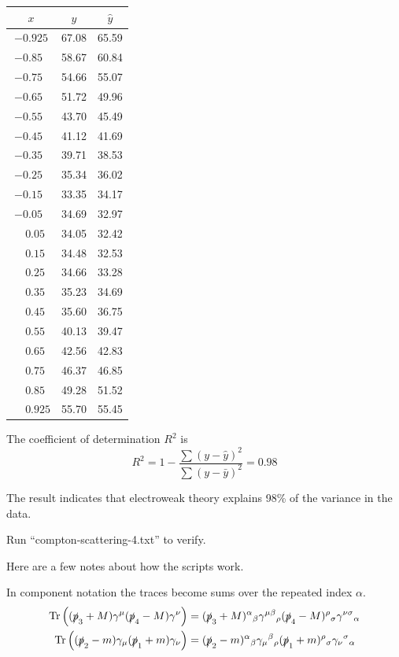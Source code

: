 \documentclass[12pt]{article}
\begin{document}
\begin{center}
\begin{tabular}{|c|c|c|}
\hline
$x$ & $y$ & $\hat{y}$ \\
\hline
$-0.925$ & 67.08 & 65.59\\
$-0.85\phantom{0}$ & 58.67 & 60.84\\
$-0.75\phantom{0}$ & 54.66 & 55.07\\
$-0.65\phantom{0}$ & 51.72 & 49.96\\
$-0.55\phantom{0}$ & 43.70 & 45.49\\
$-0.45\phantom{0}$ & 41.12 & 41.69\\
$-0.35\phantom{0}$ & 39.71 & 38.53\\
$-0.25\phantom{0}$ & 35.34 & 36.02\\
$-0.15\phantom{0}$ & 33.35 & 34.17\\
$-0.05\phantom{0}$ & 34.69 & 32.97\\
$\phantom{+}0.05\phantom{0}$ & 34.05 & 32.42\\
$\phantom{+}0.15\phantom{0}$ & 34.48 & 32.53\\
$\phantom{+}0.25\phantom{0}$ & 34.66 & 33.28\\
$\phantom{+}0.35\phantom{0}$ & 35.23 & 34.69\\
$\phantom{+}0.45\phantom{0}$ & 35.60 & 36.75\\
$\phantom{+}0.55\phantom{0}$ & 40.13 & 39.47\\
$\phantom{+}0.65\phantom{0}$ & 42.56 & 42.83\\
$\phantom{+}0.75\phantom{0}$ & 46.37 & 46.85\\
$\phantom{+}0.85\phantom{0}$ & 49.28 & 51.52\\
$\phantom{+}0.925$ & 55.70 & 55.45\\
\hline
\end{tabular}
\end{center}

\noindent
The coefficient of determination $R^2$ is
\begin{equation*}
R^2=1-\frac{\sum(y-\hat{y})^2}{\sum(y-\bar{y})^2}=0.98
\end{equation*}

\noindent
The result indicates that electroweak theory explains 98\% of the variance in the data.

\bigskip
\noindent
Run ``compton-scattering-4.txt'' to verify.

\newpage
\noindent
Here are a few notes about how the scripts work.

\bigskip
\noindent
In component notation the traces become sums over the repeated index $\alpha$.
\begin{align*}
\mathop{\rm Tr}\left((\slashed{p}_3+M)\gamma^\mu(\slashed{p}_4-M)\gamma^\nu\right)
&=
(\slashed{p}_3+M)^\alpha{}_\beta
\gamma^{\mu\beta}{}_\rho
(\slashed{p}_4-M)^\rho{}_\sigma
\gamma^{\nu\sigma}{}_\alpha
\\
\mathop{\rm Tr}\left((\slashed{p}_2-m)\gamma_\mu(\slashed{p}_1+m)\gamma_\nu\right)
&=
(\slashed{p}_2-m)^\alpha{}_\beta
\gamma_\mu{}^\beta{}_\rho
(\slashed{p}_1+m)^\rho{}_\sigma
\gamma_\nu{}^\sigma{}_\alpha
\end{align*}
\end{document}
